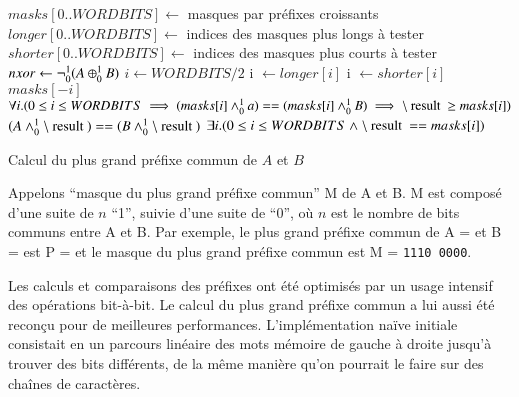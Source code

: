 %


\begin{algorithm}
\begin{algorithmic}
\State $masks[ 0 .. WORDBITS ] \gets$ masques par préfixes croissants
\State $longer[ 0 .. WORDBITS ] \gets$ indices des masques plus longs à tester
\State $shorter[ 0 .. WORDBITS ] \gets$ indices des masques plus courts à tester
\State $nxor \gets \lnot_0^1(A \oplus_0^1 B)$
\State $i \gets WORDBITS/2$
    \State i $\gets longer[i]$ 
  \Else
    \State i $\gets shorter[i]$
  \EndIf
\EndWhile\\
\Return $masks[-i]$
\Ensure $\forall i. (0 \le i \le WORDBITS \implies (masks[i] \Band a) == (masks[i] \Band B) \implies \mresult \ge masks[i])$
\Ensure $(A \Band \mresult) == (B \Band \mresult)$
\Ensure $\exists i. (0 \le i \le WORDBITS \land \mresult == masks[i])$
\end{algorithmic}
\caption{Calcul du plus grand préfixe commun de $A$ et $B$
  \label{algo:prefix}}
\end{algorithm}


Appelons ``masque du plus grand préfixe commun'' M de A et B. M est composé
d'une suite de $n$ ``1'', suivie d'une suite de ``0'', où $n$ est le nombre de
bits communs entre A et B.
Par exemple, le plus grand préfixe commun de A =  et
B =  est P =   et le
masque du plus grand préfixe commun est M = \texttt{1110\,0000}.

Les calculs et comparaisons des préfixes ont été optimisés par un usage
intensif des opérations bit-à-bit.
Le calcul du plus grand préfixe commun a lui aussi été reconçu pour de
meilleures performances.
L'implémentation naïve initiale consistait en un parcours linéaire des mots
mémoire de gauche à droite jusqu'à trouver des bits différents, de la même
manière qu'on pourrait le faire sur des chaînes de caractères.

